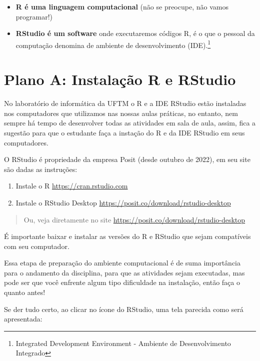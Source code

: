 \documentclass[
]{book}
\begin{document}
\begin{itemize}
\item
  \textbf{R é uma linguagem computacional} (não se preocupe, não vamos programar!)
\item
  \textbf{RStudio é um software} onde executaremos códigos R, é o que o pessoal da computação denomina de ambiente de desenvolvimento (IDE).\footnote{Integrated Development Environment - Ambiente de Desenvolvimento Integrado}
\end{itemize}

\section{Plano A: Instalação R e RStudio}\label{plano-a-instalauxe7uxe3o-r-e-rstudio}

No laboratório de informática da UFTM o R e a IDE RStudio estão instaladas nos computadores que utilizamos nas nossas aulas práticas, no entanto, nem sempre há tempo de desenvolver todas as atividades em sala de aula, assim, fica a sugestão para que o estudante faça a instação do R e da IDE RStudio em seus computadores.

O RStudio é propriedade da empresa Posit (desde outubro de 2022), em seu site são dadas as instruções:

\begin{enumerate}
\def\labelenumi{\arabic{enumi}.}
\item
  Instale o R \url{https://cran.rstudio.com}
\item
  Instale o RStudio Desktop \url{https://posit.co/download/rstudio-desktop}
\end{enumerate}

\begin{quote}
Ou, veja diretamente no site \url{https://posit.co/download/rstudio-desktop}
\end{quote}

É importante baixar e instalar as versões do R e RStudio que sejam compatíveis com seu computador.

Essa etapa de preparação do ambiente computacional é de suma importância para o andamento da disciplina, para que as atividades sejam executadas, mas pode ser que você enfrente algum tipo dificuldade na instalação, então faça o quanto antes!

Se der tudo certo, ao clicar no ícone do RStudio, uma tela parecida como será apresentada:
\end{document}
